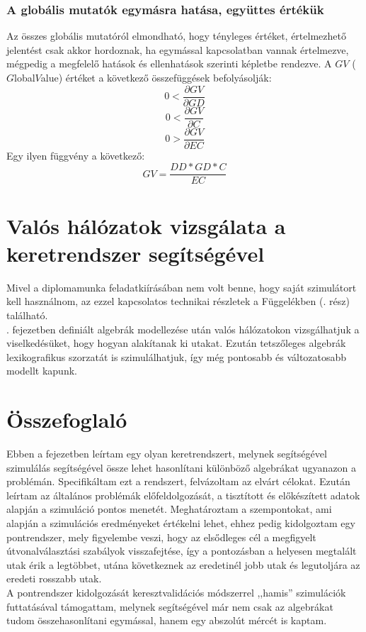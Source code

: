     \subsubsection{A globális mutatók egymásra hatása, együttes értékük}
    Az összes globális mutatóról elmondható, hogy tényleges értéket, értelmezhető jelentést csak akkor hordoznak, ha egymással kapcsolatban vannak értelmezve, mégpedig a megfelelő hatások és ellenhatások szerinti képletbe rendezve. A $GV$ ($G$lobal$V$alue) értéket a következő összefüggések befolyásolják:
    $$0 < \frac{\partial GV}{\partial GD}$$
    $$0 < \frac{\partial GV}{\partial C}$$
    $$0 > \frac{\partial GV}{\partial EC}$$
    Egy ilyen függvény a következő:
    $$GV = \frac{DD * GD * C}{EC}$$


  \section{Valós hálózatok vizsgálata a keretrendszer segítségével}\label{section_real}
  Mivel a diplomamunka feladatkiírásában nem volt benne, hogy saját szimulátort kell használnom, az ezzel kapcsolatos technikai részletek a Függelékben (. rész) található.\\

  . fejezetben definiált algebrák modellezése után valós hálózatokon vizsgálhatjuk a viselkedésüket, hogy hogyan alakítanak ki utakat. Ezután tetszőleges algebrák lexikografikus szorzatát is szimulálhatjuk, így még pontosabb és változatosabb modellt kapunk.


  \section{Összefoglaló}
  Ebben a fejezetben leírtam egy olyan keretrendszert, melynek segítségével szimulálás segítségével össze lehet hasonlítani különböző algebrákat ugyanazon a problémán. Specifikáltam ezt a rendszert, felvázoltam az elvárt célokat. Ezután leírtam az általános problémák előfeldolgozását, a tisztított és előkészített adatok alapján a szimuláció pontos menetét. Meghatároztam a szempontokat, ami alapján a szimulációs eredményeket értékelni lehet, ehhez pedig kidolgoztam egy pontrendszer, mely figyelembe veszi, hogy az elsődleges cél a megfigyelt útvonalválasztási szabályok visszafejtése, így a pontozásban a helyesen megtalált utak érik a legtöbbet, utána következnek az eredetinél jobb utak és legutoljára az eredeti rosszabb utak.\\
  A pontrendszer kidolgozását keresztvalidációs módszerrel ,,hamis'' szimulációk futtatásával támogattam, melynek segítségével már nem csak az algebrákat tudom összehasonlítani egymással, hanem egy abszolút mércét is kaptam.